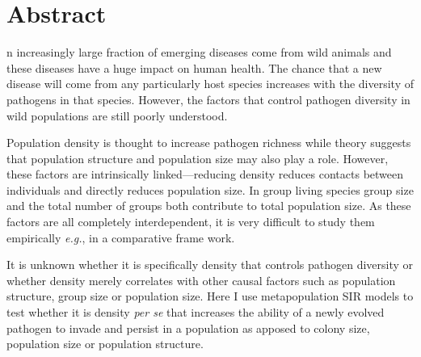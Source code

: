 










\section{Abstract}

n increasingly large fraction of emerging diseases come from wild animals and these diseases have a huge impact on human health.
The chance that a new disease will come from any particularly host species increases with the diversity of pathogens in that species.
However, the factors that control pathogen diversity in wild populations are still poorly understood.



Population density is thought to increase pathogen richness while theory suggests that population structure and population size may also play a role.
However, these factors are intrinsically linked---reducing density reduces contacts between individuals and directly reduces population size.
In group living species group size and the total number of groups both contribute to total population size. 
As these factors are all completely interdependent, it is very difficult to study them empirically \emph{e.g.}, in a comparative frame work.



It is unknown whether it is specifically density that controls pathogen diversity or whether density merely correlates with other causal factors such as population structure, group size or population size.
Here I use metapopulation SIR models to test whether it is density \emph{per se} that increases the ability of a newly evolved pathogen to invade and persist in a population as apposed to colony size, population size or population structure.


